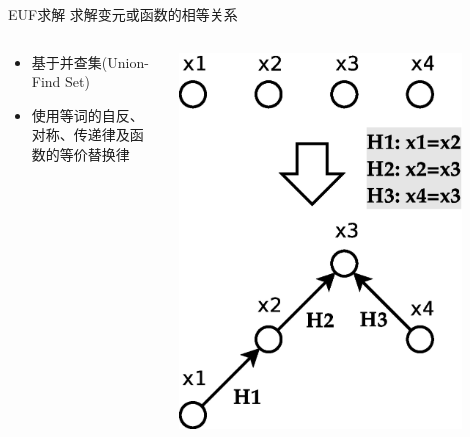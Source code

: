 \documentclass{beamer}
\begin{document}
\begin{frame}[fragile]
  \begin{block}{EUF求解}
    求解变元或函数的相等关系
  \end{block}
  \begin{block}{}
    \begin{columns}
      
      \begin{column}{0.55\textwidth}
         \begin{itemize}
         \item 基于并查集(Union-Find Set)
         \item 使用等词的自反、对称、传递律及函数的等价替换律
         \end{itemize}
      \end{column}

      \begin{column}{0.40\textwidth}
        \includegraphics[width=0.85\textwidth]{euf.eps}
      \end{column}

    \end{columns}

  \end{block}
\end{frame}
\end{document}
